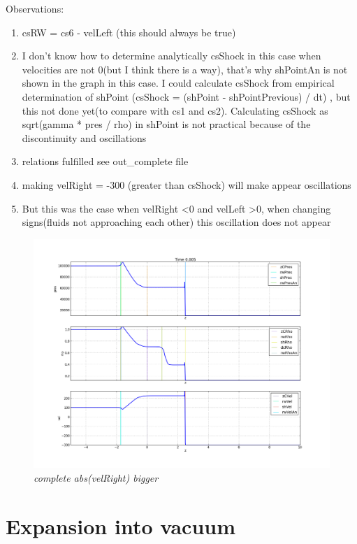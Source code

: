 \documentclass[12pt]{book}
\begin{document}
Observations:
\begin{enumerate}
\item csRW = cs6 - velLeft (this should always be true)
\item I don't know how to determine analytically csShock in this case when velocities are not 0(but I think there is a way), that's why shPointAn is not shown in the graph in this case. I could calculate csShock from empirical determination of shPoint (csShock = (shPoint - shPointPrevious) / dt) , but this not done yet(to compare with cs1 and cs2). Calculating csShock as sqrt(gamma * pres / rho) in shPoint is not practical because of the discontinuity and oscillations
\item relations fulfilled see out\_complete file
\item making velRight = -300 (greater than csShock) will make appear oscillations
\item But this was the case when velRight \textless 0 and velLeft \textgreater 0, when changing signs(fluids not approaching each other) this oscillation does not appear
\end{enumerate}

\begin{figure}[!h]
 \centering
 \includegraphics[scale=0.4]{complete300.png}
	\caption{\emph{complete abs(velRight) bigger}}
 \label{Fig: 1}
\end{figure}


\section*{Expansion into vacuum}
\end{document}
